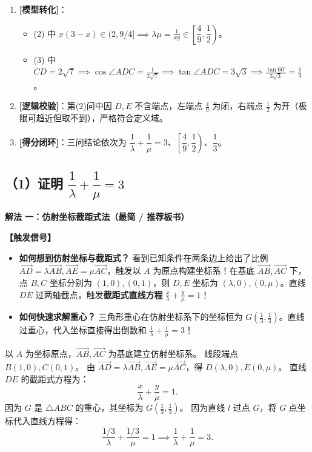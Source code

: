 \documentclass[11pt,a4paper,fontset=fandol]{ctexart}
\newcommand{\vect}[1]{\overrightarrow{#1}}
\newcommand{\ans}[1]{\boxed{#1}}
\newcommand{\method}[1]{\par\medskip\noindent\textbf{解法 #1}\par}
\begin{document}
\begin{tcolorbox}[colback=gray!4,colframe=ink!70,boxrule=0.7pt,arc=1mm,before skip=6pt,after skip=6pt,top=4pt,bottom=4pt,title=\textbf{决策路线}]
\begin{enumerate}[label=\textbf{\arabic*\ },leftmargin=1.8em]
  \item \textbf{[模型转化]}：
    \begin{itemize}
      \item (2) 中 \(x(3-x) \in (2, 9/4] \implies \lambda\mu = \frac{1}{xy} \in \left[\dfrac{4}{9}, \dfrac{1}{2}\right)\)。
      \item (3) 中 \(CD = 2\sqrt{7} \implies \cos\angle ADC = \frac{1}{2\sqrt{7}} \implies \tan\angle ADC = 3\sqrt{3} \implies \frac{\tan 60^\circ}{3\sqrt{3}} = \frac{1}{3}\)。
    \end{itemize}
  \item \textbf{[逻辑校验]}：第(2)问中因 \(D, E\) 不含端点，左端点 \(\frac{4}{9}\) 为闭，右端点 \(\frac{1}{2}\) 为开（极限可趋近但取不到），严格符合定义域。
  \item \textbf{[得分闭环]}：三问结论依次为 \(\dfrac{1}{\lambda}+\dfrac{1}{\mu}=3\)、\(\left[\dfrac{4}{9}, \dfrac{1}{2}\right)\)、\(\dfrac{1}{3}\)。
\end{enumerate}
\end{tcolorbox}

\subsection*{（1）证明 $\dfrac{1}{\lambda} + \dfrac{1}{\mu} = 3$}

\method{一：仿射坐标截距式法（最简 / 推荐板书）}

\noindent\textbf{【触发信号】}
\begin{itemize}[leftmargin=1.5em]
  \item \textbf{如何想到仿射坐标与截距式？} 看到已知条件在两条边上给出了比例 \(\vect{AD} = \lambda\vect{AB}, \vect{AE} = \mu\vect{AC}\)，触发以 $A$ 为原点构建坐标系！在基底 \(\vect{AB}, \vect{AC}\) 下，点 $B, C$ 坐标分别为 \((1,0), (0,1)\)，则 $D, E$ 坐标为 \((\lambda, 0), (0, \mu)\)。直线 $DE$ 过两轴截点，触发\textbf{截距式直线方程} \(\frac{x}{\lambda} + \frac{y}{\mu} = 1\)！
  \item \textbf{如何快速求解重心？} 三角形重心在仿射坐标系下的坐标恒为 \(G\left(\frac{1}{3}, \frac{1}{3}\right)\)。直线过重心，代入坐标直接得出倒数和 \(\frac{1}{\lambda} + \frac{1}{\mu} = 3\)！
\end{itemize}

以 $A$ 为坐标原点，$\vect{AB}, \vect{AC}$ 为基底建立仿射坐标系。
线段端点 $B(1,0), C(0,1)$。
由 $\vect{AD} = \lambda\vect{AB}, \vect{AE} = \mu\vect{AC}$，得 $D(\lambda, 0), E(0, \mu)$。
直线 $DE$ 的截距式方程为：
\[
\frac{x}{\lambda} + \frac{y}{\mu} = 1.
\]
因为 $G$ 是 $\triangle ABC$ 的重心，其坐标为 $G\left(\frac{1}{3}, \frac{1}{3}\right)$。
因为直线 $l$ 过点 $G$，将 $G$ 点坐标代入直线方程得：
\[
\frac{1/3}{\lambda} + \frac{1/3}{\mu} = 1 \implies \ans{\frac{1}{\lambda} + \frac{1}{\mu} = 3}.
\]
\end{document}
